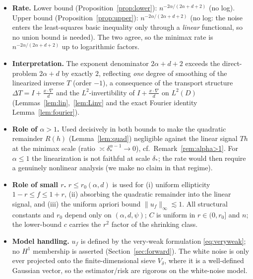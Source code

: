 \documentclass[11pt]{article}
\theoremstyle{remark}
\newcommand{\norm}[1]{\lVert #1\rVert}
\begin{document}
\begin{itemize}[itemsep=2pt]
\item \textbf{Rate.} Lower bound (Proposition~\ref{prop:lower}):
$n^{-2\alpha/(2\alpha+d+2)}$ (no log). Upper bound
(Proposition~\ref{prop:upper}): $n^{-2\alpha/(2\alpha+d+2)}$ (no log:
the noise enters the least-squares basic inequality only through a
\emph{linear} functional, so no union bound is needed). The two agree, so
the minimax rate is $n^{-2\alpha/(2\alpha+d+2)}$ up to logarithmic factors.
\item \textbf{Interpretation.} The exponent denominator
$2\alpha+d+2$ exceeds the direct-problem $2\alpha+d$ by exactly $2$,
reflecting \emph{one} degree of smoothing of the linearized inverse $T$
(order $-1$), a consequence of the transport structure
$\Delta T=I+\frac{x\cdot\nabla}{d}$ and the $L^{2}$-invertibility of
$I+\frac{x\cdot\nabla}{d}$ on $L^{2}(D)$
(Lemmas~\ref{lem:lin},~\ref{lem:Linv} and the exact Fourier identity
Lemma~\ref{lem:fourier}).
\item \textbf{Role of $\alpha>1$.} Used decisively in both bounds to make
the quadratic remainder $R(h)$
(Lemma~\ref{lem:quad}) negligible against the linear signal $Th$ at the
minimax scale (ratio $\asymp\delta_*^{\alpha-1}\to0$), cf.\
Remark~\ref{rem:alpha>1}. For $\alpha\le1$ the linearization is not
faithful at scale $\delta_*$; the rate would then require a genuinely
nonlinear analysis (we make no claim in that regime).
\item \textbf{Role of small $r$.} $r\le r_0(\alpha,d)$ is used for
(i) uniform ellipticity $1-r\le f\le1+r$, (ii) absorbing the quadratic
remainder into the linear signal, and (iii) the uniform apriori bound
$\norm{u_f}_\infty\lesssim1$. All structural constants and $r_0$ depend only on $(\alpha,d,\psi)$;
$C$ is uniform in $r\in(0,r_0]$ and $n$; the lower-bound $c$ carries the
$r^{2}$ factor of the shrinking class.
\item \textbf{Model handling.} $u_f$ is defined by the very-weak formulation
\eqref{eq:veryweak}; no $H^1$ membership is asserted
(Section~\ref{sec:forward}). The white noise is only ever projected onto
the finite-dimensional sieve $V_\delta$, where it is a well-defined
Gaussian vector, so the estimator/risk are rigorous on the white-noise
model.
\end{itemize}
\end{document}
